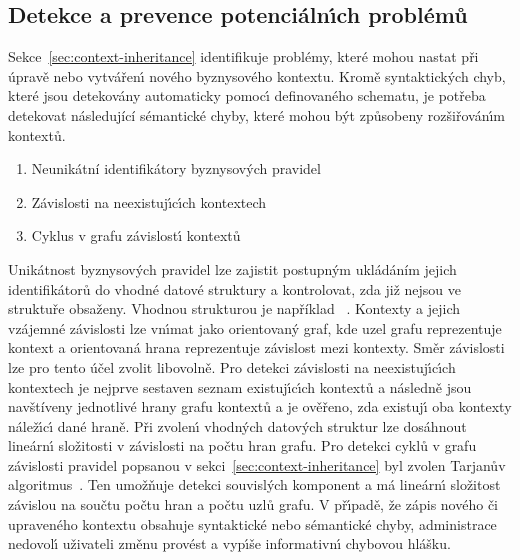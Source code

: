 
\subsection{Detekce a prevence potenciáln\'{\i}ch problémů}

Sekce~\ref{sec:context-inheritance} identifikuje problémy, které
mohou nastat při úpravě nebo vytvářen\'{\i} nového byznysového kontextu.
Kromě syntaktick\'ych chyb, které jsou detekovány automaticky pomoc\'{\i} definovaného schematu,
je potřeba detekovat následující sémantické chyby, které mohou b\'yt způsobeny rozšiřován\'{\i}m kontextů.
\begin{enumerate}[label=\alph*)]
    \item Neunikátní identifikátory byznysových pravidel
    \item Závislosti na neexistuj\'{\i}c\'{\i}ch kontextech
    \item Cyklus v grafu závislost\'{\i} kontextů
\end{enumerate}

Unikátnost byznysových pravidel lze zajistit postupným ukládáním jejich identifikátorů
do vhodné datové struktury a kontrolovat, zda již nejsou ve struktuře obsaženy. Vhodnou
strukturou je například ~\cite{hopcroft1983data}.
Kontexty a jejich vzájemné závislosti lze vn\'{\i}mat jako
orientovan\'y graf, kde uzel grafu reprezentuje kontext
a orientovaná hrana reprezentuje závislost mezi kontexty.
Směr závislosti lze pro tento účel zvolit libovolně.
Pro detekci závislosti na neexistuj\'{\i}c\'{\i}ch kontextech je nejprve
sestaven seznam existuj\'{\i}c\'{\i}ch kontextů a následně jsou navštíveny
jednotlivé hrany grafu kontextů a je ověřeno, zda existuj\'{\i} oba kontexty
nálež\'{\i}c\'{\i} dané hraně. Při zvolen\'{\i} vhodn\'ych datov\'ych struktur
lze dosáhnout lineárn\'{\i} složitosti v závislosti na počtu hran grafu.
Pro detekci cyklů v grafu závislosti pravidel popsanou v sekci~\ref{sec:context-inheritance} byl
zvolen Tarjanův algoritmus~\cite{tarjan1971depth}. Ten umožňuje detekci souvisl\'ych
komponent a má lineárn\'{\i} složitost závislou na součtu počtu hran a
počtu uzlů grafu. V př\'{\i}padě, že zápis nového či upraveného kontextu obsahuje syntaktické
nebo sémantické chyby, administrace nedovol\'{\i} uživateli změnu provést a vyp\'{\i}še informativn\'{\i}
chybovou hlášku.

